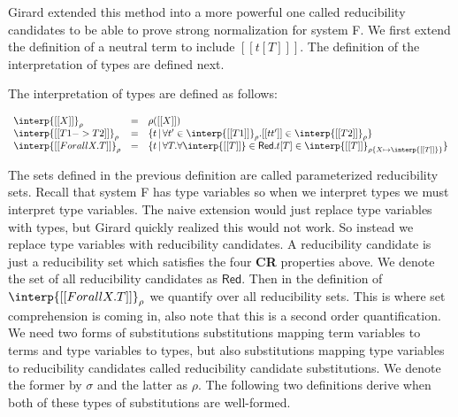 Girard extended this method into a more powerful one called
reducibility candidates to be able to prove strong normalization for
system F.  We first extend the definition of a neutral term to include
$[[ t [T] ]]$.  The definition of the interpretation of types are defined
next.
\begin{definition}
  \label{def:stlc_interpretation_taits}
  The interpretation of types are defined as follows:
  \begin{center}
    \begin{math}
      \begin{array}{lll}
        \interp{[[X]]}_\rho & = & \rho([[X]])\\
        \interp{[[T1 -> T2]]}_\rho & = & \{ t\,|\,\forall t' \in \interp{[[T1]]}_\rho.
               [[t t']] \in \interp{[[T2]]}_\rho \}\\
        \interp{[[Forall X.T]]}_\rho & = & \{ t\,|\,\forall T.
        \forall \interp{[[T]]} \in \mathsf{Red}.
        t[T] \in \interp{[[T]]}_{\rho\{X \mapsto \interp{[[T]]} \}} \}
      \end{array}
    \end{math}
  \end{center}
\end{definition}
The sets defined in the previous definition are called parameterized
reducibility sets.  Recall that system F has type variables so when we
interpret types we must interpret type variables.  The naive extension
would just replace type variables with types, but Girard quickly
realized this would not work.  So instead we replace type variables
with reducibility candidates.  A reducibility candidate is just a
reducibility set which satisfies the four \textbf{CR} properties
above.  We denote the set of all reducibility candidates as
$\mathsf{Red}$.  Then in the definition of $\interp{[[Forall
      X.T]]}_\rho$ we quantify over all reducibility sets.  This is
where set comprehension is coming in, also note that this is a second
order quantification.  We need two forms of substitutions
substitutions mapping term variables to terms and type variables to
types, but also substitutions mapping type variables to reducibility
candidates called reducibility candidate substitutions.  We denote the
former by $\sigma$ and the latter as $\rho$.  The following two
definitions derive when both of these types of substitutions are
well-formed.
